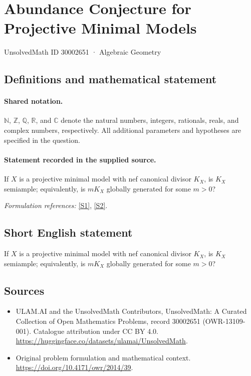 \documentclass[11pt]{article}
\newcommand{\sref}[2]{\hyperlink{source:#1:#2}{[S#2]}}
\begin{document}
\setcounter{section}{30002650}
\section{Abundance Conjecture for Projective Minimal Models}\label{30002651}
{\small UnsolvedMath ID 30002651 · Algebraic Geometry}
\subsection{Definitions and mathematical statement}

\paragraph{Shared notation.}$\mathbb N$, $\mathbb Z$, $\mathbb Q$, $\mathbb R$, and $\mathbb C$ denote the natural numbers, integers, rationals, reals, and complex numbers, respectively. All additional parameters and hypotheses are specified in the question.


\paragraph{Statement recorded in the supplied source.}
If $X$ is a projective minimal model with nef canonical divisor $K_X$, is $K_X$ semiample; equivalently, is $mK_X$ globally generated for some $m>0$?
\par\smallskip\textit{Formulation references:} \sref{30002651}{1}, \sref{30002651}{2}.
\subsection{Short English statement}
If $X$ is a projective minimal model with nef canonical divisor $K_X$, is $K_X$ semiample; equivalently, is $mK_X$ globally generated for some $m>0$?
\subsection{Sources}
\begin{itemize}
\item[\hypertarget{source:30002651:1}{S1}] ULAM.AI and the UnsolvedMath Contributors, UnsolvedMath: A Curated Collection of Open Mathematics Problems, record 30002651 (OWR-13109-001). Catalogue attribution under CC BY 4.0.
\url{https://huggingface.co/datasets/ulamai/UnsolvedMath}.
\item[\hypertarget{source:30002651:2}{S2}] Original problem formulation and mathematical context.
\url{https://doi.org/10.4171/owr/2014/39}.
\end{itemize}
\label{end:30002651}
\end{document}

